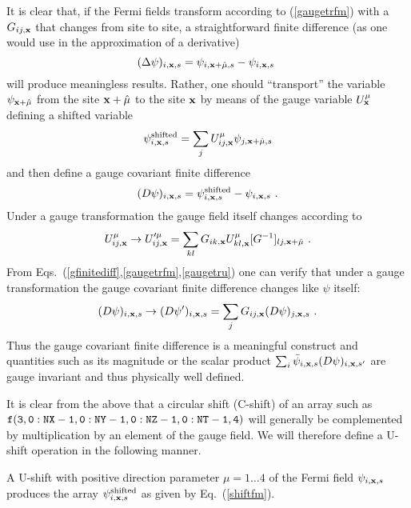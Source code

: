 It is clear that, if the Fermi fields transform according to (\ref{gaugetrfm}) 
with a $G_{ij,{\bf x}}$ that changes from site to site, a straightforward
finite difference (as one would use in the approximation of a derivative)
%
\begin{equation}
(\Delta \psi)_{i,{\bf x},s} = \psi_{i,{{\bf x}+\hat\mu},s} -
\psi_{i,{\bf x},s}  \ 
\label{finitediff}
\end{equation}
%
will produce meaningless results.  Rather, one should ``transport''
the variable $\psi_{{\bf x}+\hat\mu}$ from the site 
${{\bf x}+\hat\mu}$ to the site $\bf x$ by means of the gauge variable
$U_{\bf x}^{\mu}$ defining a shifted variable 
%
\begin{equation}
\psi^{\rm shifted}_{i,{\bf x},s} = \sum_j U_{ij,{\bf x}}^{\mu}
\psi_{j,{{\bf x}+\hat\mu},s} 
\label{shiftfm}
\end{equation}
%
and then define a gauge covariant finite difference
%
\begin{equation}
(D \psi)_{i,{\bf x},s} = \psi^{\rm shifted}_{i,{\bf x},s} - 
\psi_{i,{\bf x},s}  \ .
\label{gfinitediff}
\end{equation}
%
Under a gauge transformation the gauge field itself changes according
to 
%
\begin{equation}
U_{ij,{\bf x}}^{\mu} \to U_{ij,{\bf x}}^{\prime \mu} =
\sum_{kl} G_{ik,{\bf x}} U_{kl,{\bf x}}^{\mu} [G^{-1}]_{lj,{\bf x}+\hat\mu}
 \ .
\label{gaugetru}
\end{equation}
%
 From Eqs.~(\ref{gfinitediff},\ref{gaugetrfm},\ref{gaugetru}) one can verify
that under a gauge transformation the gauge covariant finite difference 
changes like $\psi$ itself:
%
\begin{equation}
(D \psi)_{i,{\bf x},s} \to (D \psi')_{i,{\bf x},s} =
\sum_j G_{ij,{\bf x}} (D \psi)_{j,{\bf x},s}  \ .
\label{gaugetrD}
\end{equation}
%
Thus the gauge covariant finite difference is a meaningful construct
and quantities such as its magnitude or the scalar product
$\sum_{i} \bar\psi_{i,{\bf x},s} (D \psi)_{i,{\bf x},s'}$ are gauge invariant
and thus physically well defined. 

It is clear from the above that a circular shift (C-shift) of an array
such as $\tt f(3,0:NX-1,0:NY-1,0:NZ-1,0:NT-1,4)$ will generally be
complemented by multiplication by an element of the gauge field.
We will therefore define a U-shift operation in the following manner.

A U-shift with positive direction parameter $\mu = 1 \dots 4$ of the
Fermi field $\psi_{i,{\bf x},s}$ produces the array 
$\psi^{\rm shifted}_{i,{\bf x},s}$ as given by Eq.~(\ref{shiftfm}).


